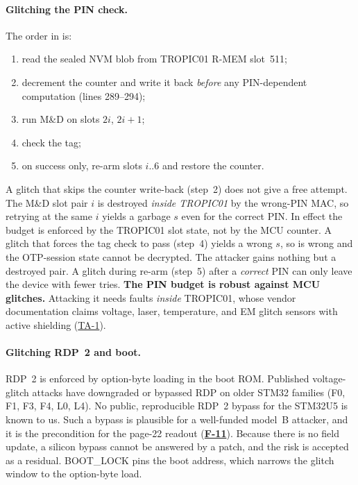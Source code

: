 \documentclass[11pt,a4paper]{article}
\newcommand{\fid}[1]{\textbf{#1}}
\begin{document}
\paragraph{Glitching the PIN check.} The order in  is:
\begin{enumerate}
\item read the sealed NVM blob from TROPIC01 R-MEM slot~511;
\item decrement the counter  and write it back \emph{before} any PIN-dependent computation (lines 289--294);
\item run M\&D on slots $2i$, $2i{+}1$;
\item check the tag;
\item on success only, re-arm slots $i..6$ and restore the counter.
\end{enumerate}
A glitch that skips the counter write-back (step~2) does not give a free attempt. The M\&D slot pair $i$ is destroyed \emph{inside TROPIC01} by the wrong-PIN MAC, so retrying at the same $i$ yields a garbage $s$ even for the correct PIN. In effect the budget is enforced by the TROPIC01 slot state, not by the MCU counter. A glitch that forces the tag check to pass (step~4) yields a wrong $s$, so  is wrong and the OTP-session state cannot be decrypted. The attacker gains nothing but a destroyed pair. A glitch during re-arm (step~5) after a \emph{correct} PIN can only leave the device with fewer tries. \textbf{The PIN budget is robust against MCU glitches.} Attacking it needs faults \emph{inside} TROPIC01, whose vendor documentation claims voltage, laser, temperature, and EM glitch sensors with active shielding (\hyperref[ta:TA-1]{TA-1}).

\paragraph{Glitching RDP~2 and boot.} RDP~2 is enforced by option-byte loading in the boot ROM. Published voltage-glitch attacks have downgraded or bypassed RDP on older STM32 families (F0, F1, F3, F4, L0, L4). No public, reproducible RDP~2 bypass for the STM32U5 is known to us. Such a bypass is plausible for a well-funded model~B attacker, and it is the precondition for the page-22 readout (\hyperref[f:F-11]{\fid{F-11}}). Because there is no field update, a silicon bypass cannot be answered by a patch, and the risk is accepted as a residual. BOOT\_LOCK pins the boot address, which narrows the glitch window to the option-byte load.
\end{document}

